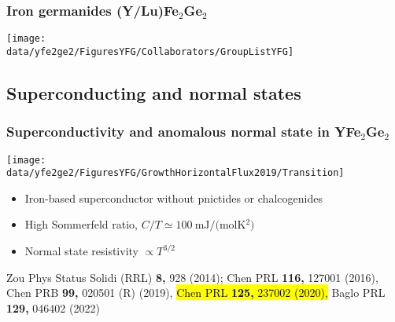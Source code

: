 
\begin{frame}[plain,label=YFGCollab]
\frametitle {Iron germanides (Y/Lu)Fe$_2$Ge$_2$}
\vspace{0em}
\texttt{[image: \\data/yfe2ge2/FiguresYFG/Collaborators/GroupListYFG]}
\end{frame}

\subsection{Superconducting and normal states}
\begin{frame}[label=YFGIntro]
\frametitle{Superconductivity and anomalous normal state in YFe$_2$Ge$_2$}

\centerline{\texttt{[image: \\data/yfe2ge2/FiguresYFG/GrowthHorizontalFlux2019/Transition]} }
\begin{itemize}
\item
Iron-based superconductor without pnictides or chalcogenides
\item
High Sommerfeld ratio, $C/T \simeq \SI{100}{\mJ/(\mol\kelvin^2)}$
\item
Normal state resistivity $\propto T^{3/2}$
\end{itemize}

\vspace*{\fill}
\centerline{\makebox[\linewidth]{\rule{0.85\textwidth}{0.4pt}}}
\begin{center}
{\scriptsize Zou Phys Status Solidi (RRL) {\bf 8,} 928
  (2014); Chen PRL {\bf 116,} 127001 (2016), Chen PRB {\bf 99,} 020501 (R) (2019), \hl{Chen PRL {\bf 125,} 237002 (2020), } {Baglo PRL {\bf 129,} 046402 (2022)}}
  \end{center}
\end{frame}


